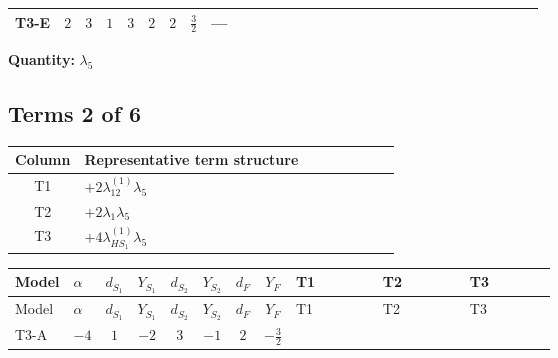 \documentclass[8pt]{article}
\begin{document}
\begin{landscape}
\begin{longtable}{@{}llcccccc >{\raggedright\arraybackslash}p{0.21\linewidth} >{\raggedright\arraybackslash}p{0.21\linewidth} >{\raggedright\arraybackslash}p{0.21\linewidth}@{}}
\midrule
T3-E & $2$ & $3$ & $1$ & $3$ & $2$ & $2$ & $\frac{3}{2}$ & --- & \scriptsize\adjustbox{max width=\linewidth}{$\begin{gathered} -\frac{33 {g_2}^2 {\lambda_5}}{2}\end{gathered}$} & \scriptsize\adjustbox{max width=\linewidth}{$\begin{gathered} -\frac{33 {g_1}^2 {\lambda_5}}{2}\end{gathered}$} \\
\midrule
\bottomrule
\end{longtable}
\clearpage
\noindent\textbf{Quantity: }$\lambda_5$\par\smallskip
\subsection*{Terms 2 of 6}
\begin{center}
\begin{tabular}{@{}c >{\raggedright\arraybackslash}p{0.82\linewidth}@{}}
\toprule
Column & Representative term structure \\
\midrule
T1 & \(\displaystyle +2 {\lambda_{12}^{(1)}} {\lambda_5}\) \\
\midrule
T2 & \(\displaystyle +2 {\lambda_1} {\lambda_5}\) \\
\midrule
T3 & \(\displaystyle +4 {\lambda_{HS_1}^{(1)}} {\lambda_5}\) \\
\midrule
\bottomrule
\end{tabular}
\end{center}
\smallskip
\tiny
\begin{longtable}{@{}llcccccc >{\raggedright\arraybackslash}p{0.21\linewidth} >{\raggedright\arraybackslash}p{0.21\linewidth} >{\raggedright\arraybackslash}p{0.21\linewidth}@{}}
\toprule
Model & $\alpha$ & $d_{S_1}$ & $Y_{S_1}$ & $d_{S_2}$ & $Y_{S_2}$ & $d_F$ & $Y_F$ & T1 & T2 & T3 \\
\midrule
\endfirsthead
\toprule
Model & $\alpha$ & $d_{S_1}$ & $Y_{S_1}$ & $d_{S_2}$ & $Y_{S_2}$ & $d_F$ & $Y_F$ & T1 & T2 & T3 \\
\midrule
\endhead
T3-A & $-4$ & $1$ & $-2$ & $3$ & $-1$ & $2$ & $-\frac{3}{2}$ & \scriptsize\adjustbox{max width=\linewidth}{$\begin{gathered} +2 {\lambda_{12}^{(1)}} {\lambda_5}\end{gathered}$} & \scriptsize\adjustbox{max width=\linewidth}{$\begin{gathered} +2 {\lambda_1} {\lambda_5}\end{gathered}$} & \scriptsize\adjustbox{max width=\linewidth}{$\begin{gathered} +4 {\lambda_{HS_1}^{(1)}} {\lambda_5}\end{gathered}$} \\

\end{longtable}
\end{landscape}
\end{document}
